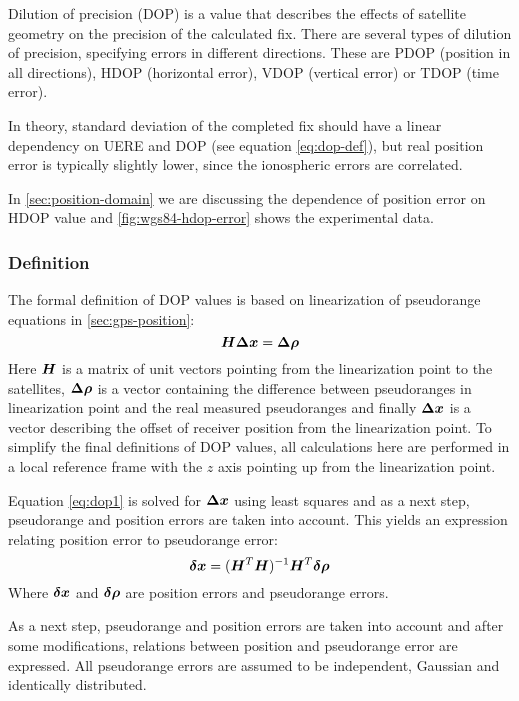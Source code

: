 Dilution of precision (DOP) is a value that describes the effects of satellite geometry
on the precision of the calculated fix.
There are several types of dilution of precision, specifying errors in different directions.
These are PDOP (position in all directions), HDOP (horizontal error), VDOP (vertical error)
or TDOP (time error).

In theory, standard deviation of the completed fix should have a linear dependency on
UERE and DOP (see equation \eqref{eq:dop-def}), but real position error is typically slightly lower,
since the ionospheric errors are correlated.

In \cref{sec:position-domain} we are discussing the dependence of position error on HDOP value
and \cref{fig:wgs84-hdop-error} shows the experimental data.

\subsubsection{Definition}
The formal definition of DOP values is based on linearization of pseudorange equations
in \cref{sec:gps-position}:
\begin{equation}
	\label{eq:dop1}
	\bm{H}\bm{\Delta{}x} = \bm{\Delta{}\rho}
\end{equation}
Here \(\bm{H}\) is a matrix of unit vectors pointing from the linearization point
to the satellites, \(\bm{\Delta{}\rho}\) is a vector containing the difference between
pseudoranges in linearization point and the real measured pseudoranges and finally
\(\bm{\Delta{}x}\) is a vector describing the offset of receiver position from the
linearization point.
To simplify the final definitions of DOP values, all calculations here are performed
in a local reference frame with the \(z\) axis pointing up from the linearization point.

Equation \eqref{eq:dop1} is solved for \(\bm{\Delta{}x}\) using least squares and
as a next step, pseudorange and position errors are taken into account.
This yields an expression relating position error to pseudorange error:
\begin{equation}
	\bm{\delta{}x} = (\bm{H}^T \bm{H})^{-1} \bm{H}^T \bm{\delta{}\rho}
\end{equation}
Where \(\bm{\delta{}x}\) and \(\bm{\delta{}\rho}\) are position errors and pseudorange errors.

As a next step, pseudorange and position errors are taken into account and after
some modifications, relations between position and pseudorange error are expressed.
All pseudorange errors are assumed to be independent, Gaussian and identically distributed.

